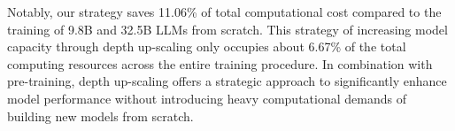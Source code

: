 Notably, our strategy saves 11.06\% of total computational cost compared to the training of 9.8B and 32.5B LLMs from scratch.
This strategy of increasing model capacity through depth up-scaling only occupies about 6.67\% of the total computing resources across the entire training procedure. 
In combination with pre-training, depth up-scaling offers a strategic approach to significantly enhance model performance without introducing heavy computational demands of building new models from scratch.
